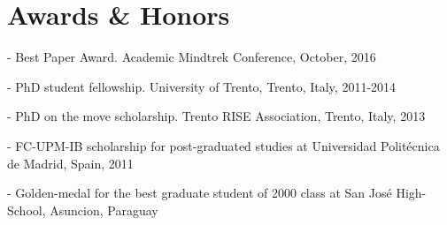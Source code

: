 
\section{Awards \& Honors}

- Best Paper Award. Academic Mindtrek Conference, October, 2016

- PhD student fellowship. University of Trento, Trento, Italy, 2011-2014

- PhD on the move scholarship. Trento RISE Association, Trento, Italy, 2013

- FC-UPM-IB scholarship for post-graduated studies at Universidad Politécnica de Madrid, Spain, 2011

- Golden-medal for the best graduate student of 2000 class at San José High-School, Asuncion, Paraguay
